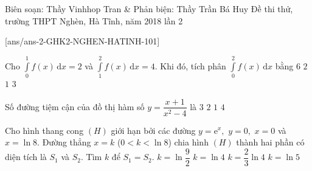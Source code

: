 \begin{name}
	{Biên soạn: Thầy Vinhhop Tran \& Phản biện: Thầy Trần Bá Huy}
	{Đề thi thử, trường THPT Nghèn, Hà Tĩnh, năm 2018 lần 2}
\end{name}
\setcounter{ex}{0}\setcounter{bt}{0}
[ans/ans-2-GHK2-NGHEN-HATINH-101]
\begin{ex}%
Cho $\displaystyle \int\limits_0^1f(x)\mathrm{\,d}x=2$ và $\displaystyle \int\limits_1^2f(x)\mathrm{\,d}x=4$. Khi đó, tích phân $\displaystyle \int\limits_0^2f(x)\mathrm{\,d}x$ bằng
\choice
{\True $6$}
{$2$}
{$1$}
{$3$}
\end{ex}

\begin{ex}%
Số đường tiệm cận của đồ thị hàm số $y=\dfrac{x+1}{x^2-4}$ là
\choice
{\True $3$}
{$2$}
{$1$}
{$4$}
\end{ex}

\begin{ex}%
Cho hình thang cong $(H)$ giới hạn bởi các đường $y=\mathrm{e}^x,$ $y=0,$ $x=0$ và $x=\ln 8.$ Đường thẳng $x=k$ ($0<k<\ln8$) chia hình $(H)$ thành hai phần có diện tích là $S_1$ và $S_2$. Tìm $k$ để $S_1=S_2$.
\choice
{\True $k=\ln\dfrac92$}
{$k=\ln 4$}
{$k=\dfrac23\ln4$}
{$k=\ln 5$}
\end{ex}


